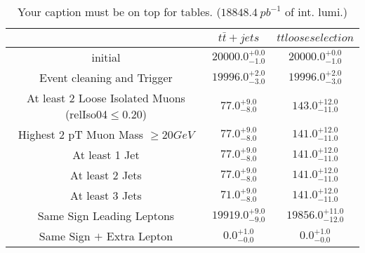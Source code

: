 \documentclass{article}
\begin{document}
\begin{table}
\caption{Your caption must be on top for tables. ($18848.4~pb^{-1}$ of int. lumi.)}
\label{tab:}
\centering
\begin{tabular}{|c|cc|}
\toprule
&$t\bar{t}+jets$	&$tt loose selection$	\\

\midrule
initial&	$20000.0^{+0.0}_{-1.0}$	&$20000.0^{+0.0}_{-1.0}$	\\

Event cleaning and Trigger&	$19996.0^{+2.0}_{-3.0}$	&$19996.0^{+2.0}_{-3.0}$	\\

At least 2 Loose Isolated Muons (relIso04$\leq 0.20$)&	$77.0^{+9.0}_{-8.0}$	&$143.0^{+12.0}_{-11.0}$	\\

Highest 2 pT Muon Mass $\geq 20 GeV$&	$77.0^{+9.0}_{-8.0}$	&$141.0^{+12.0}_{-11.0}$	\\

At least 1  Jet&	$77.0^{+9.0}_{-8.0}$	&$141.0^{+12.0}_{-11.0}$	\\

At least 2 Jets&	$77.0^{+9.0}_{-8.0}$	&$141.0^{+12.0}_{-11.0}$	\\

At least 3 Jets&	$71.0^{+9.0}_{-8.0}$	&$141.0^{+12.0}_{-11.0}$	\\

Same Sign Leading Leptons&	$19919.0^{+9.0}_{-9.0}$	&$19856.0^{+11.0}_{-12.0}$	\\

Same Sign $+$ Extra Lepton&	$0.0^{+1.0}_{-0.0}$	&$0.0^{+1.0}_{-0.0}$	\\

\bottomrule
\end{tabular}
\end{table}
\end{document}
